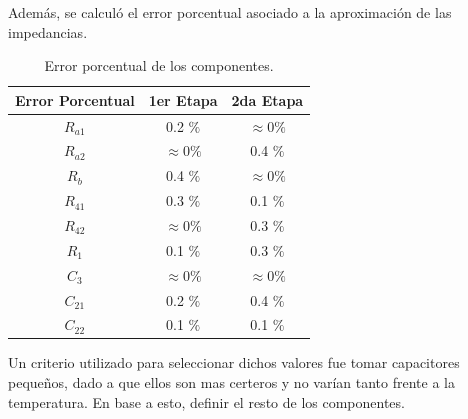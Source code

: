 Además, se calculó el error porcentual asociado a la aproximación de las impedancias.
\begin{table}[H]
\centering
\begin{tabular}{ccc}
\hline
\multicolumn{1}{c}{Error Porcentual} & \multicolumn{1}{c}{1er Etapa} & \multicolumn{1}{c}{2da Etapa} \\ \hline
$R_{a1}$                                & 0.2 $\%$                      & $\approx 0 \%$                \\
$R_{a2}$                                & $\approx 0 \%$                & 0.4 $\%$                      \\
$R_b$                                & 0.4 $\%$                      & $\approx 0 \%$                \\
$R_{41}$                                & 0.3 $\%$                      & 0.1 $\%$                      \\
$R_{42}$                                & $\approx 0 \%$                & 0.3 $\%$                      \\
$R_1$                                & 0.1 $\%$                      & 0.3 $\%$                      \\
$C_3$                                & $\approx 0 \%$                & $\approx 0 \%$                \\
$C_{21}$                                & 0.2 $\%$                      & 0.4 $\%$                      \\
$C_{22}$                                & 0.1 $\%$                      & 0.1 $\%$        \\
\hline
\end{tabular}
\caption{Error porcentual de los componentes.}
\end{table}

Un criterio utilizado para seleccionar dichos valores fue tomar capacitores pequeños, dado a que ellos son mas certeros y no varían tanto frente a la temperatura. En base a esto, definir el resto de los componentes.  

